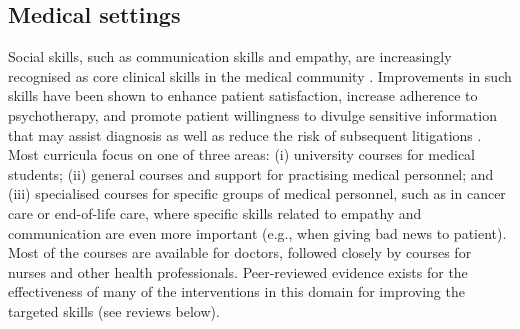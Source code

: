 \documentclass[prodmode,acmtochi]{acmsmall}
\newcommand{\GeraldineFIX}[1]{}
\begin{document}
\subsection{Medical settings}
\GeraldineFIX{ G: need to think about this TITLE bit more - is this meant to be medical as in just doctors, or medical in its broader sense? Eg doctors, nurses, allied health, therapists, etc ... in which case 'clinical settings' might be a more encompassing term.... }
\GeraldineFIX{ G: then in writing up. you can say you focus first on the medical profession ... and do the doctor-patient training .... and then look at other healthcare/clinical professions more generally eg including nurses, physios, counsellers/therapists etc???}
\GeraldineFIX{ G: Also think the section structure could be thought about a bit more ... eg is it useful to separate out different SEL foci:... \\
1. being a better dr and managing own HWB (eg mindfulness skills); \\
2. general clinican-patient relationship eg.\\
gathering information from patient (interview/question skills???); giving difficult news;  establishing collaboratively designed care plans, empowering patients to take own responsibility etc ... there is a term for this model fo care but can't remember! (eg as in motivational interviewing)}

Social skills, such as communication skills and empathy, are increasingly recognised as core clinical skills in the medical community \cite{Rider2006,Barth2011,Makoul2007,Kalet2004}. Improvements in such skills have been shown to enhance patient satisfaction, increase adherence to psychotherapy, and promote patient willingness to divulge sensitive information that may assist diagnosis as well as reduce the risk of subsequent litigations \cite{Stewart1995,Brown2008}. %
Most curricula focus on one of  three areas: (i) university courses for medical students; (ii) general courses and support for practising medical personnel; and (iii) specialised courses for specific groups of medical personnel, such as in cancer care or end-of-life care, where specific skills related to empathy and communication are even more important        (e.g., when giving bad news to patient). Most of the courses are available for doctors, followed closely by courses for nurses and other health professionals. Peer-reviewed evidence exists for the effectiveness of  many of the interventions in this domain for improving the targeted skills
(see reviews below).
\end{document}
